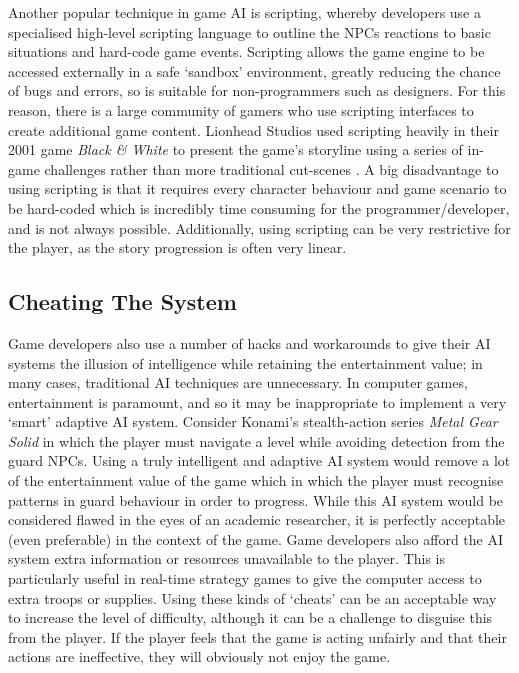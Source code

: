 \documentclass[a4paper,oneside]{report}
\begin{document}
Another popular technique in game AI is scripting, whereby developers use a specialised high-level scripting language to outline the NPCs reactions to basic situations and hard-code game events. Scripting allows the game engine to be accessed externally in a safe `sandbox' environment, greatly reducing the chance of bugs and errors, so is suitable for non-programmers such as designers. For this reason, there is a large community of gamers who use scripting interfaces to create additional game content. Lionhead Studios used scripting heavily in their 2001 game \emph{Black \& White} to present the game's storyline using a series of in-game challenges rather than more traditional cut-scenes \cite{:hc}. A big disadvantage to using scripting is that it requires every character behaviour and game scenario to be hard-coded which is incredibly time consuming for the programmer/developer, and is not always possible. Additionally, using scripting can be very restrictive for the player, as the story progression is often very linear.

\subsection{Cheating The System}

Game developers also use a number of hacks and workarounds to give their AI systems the illusion of intelligence while retaining the entertainment value; in many cases, traditional AI techniques are unnecessary. In computer games, entertainment is paramount, and so it may be inappropriate to implement a very `smart' adaptive AI system. Consider Konami's stealth-action series \emph{Metal Gear Solid} in which the player must navigate a level while avoiding detection from the guard NPCs. Using a truly intelligent and adaptive AI system would remove a lot of the entertainment value of the game which in which the player must recognise patterns in guard behaviour in order to progress. While this AI system would be considered flawed in the eyes of an academic researcher, it is perfectly acceptable (even preferable) in the context of the game. Game developers also afford the AI system extra information or resources unavailable to the player. This is particularly useful in real-time strategy games to give the computer access to extra troops or supplies. Using these kinds of `cheats' can be an acceptable way to increase the level of difficulty, although it can be a challenge to disguise this from the player. If the player feels that the game is acting unfairly and that their actions are ineffective, they will obviously not enjoy the game.
\end{document}
